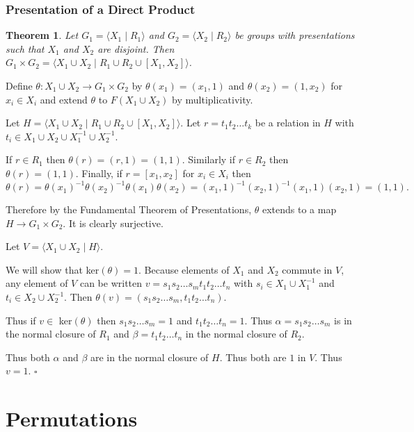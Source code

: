 \documentclass[10pt]{article}
\newtheorem{theorem}{Theorem}[section]
\newenvironment{proof}[1][Proof]{\begin{trivlist}
\item[\hskip \labelsep {\itshape #1}]}{\end{trivlist}}
\begin{document}
\subsubsection{Presentation of a Direct Product}

\begin{theorem}
Let $G_1 = \langle X_1 \;|\; R_1 \rangle$ and $G_2 = \langle X_2 \;|\; R_2 \rangle$ be groups with presentations such that $X_1$ and $X_2$ are disjoint. Then $G_1\times G_2 = \langle X_1\cup X_2 \;|\; R_1\cup R_2\cup [X_1, X_2] \rangle$.
\end{theorem}

\begin{proof}
Define $\theta : X_1\cup X_2 \to G_1\times G_2$ by $\theta(x_1) = (x_1, 1)$ and $\theta(x_2) = (1, x_2)$ for $x_i \in X_i$ and extend $\theta$ to $F(X_1\cup X_2)$ by multiplicativity.

Let $H = \langle X_1\cup X_2 \;|\; R_1\cup R_2\cup [X_1, X_2] \rangle$. Let $r = t_1t_2\ldots t_k$ be a relation in $H$ with $t_i \in X_1\cup X_2\cup X_1^{-1}\cup X_2^{-1}$.

If $r \in R_1$ then $\theta(r) = (r, 1) = (1, 1)$. Similarly if $r \in R_2$ then $\theta(r) = (1, 1)$. Finally, if $r = [x_1, x_2]$ for $x_i \in X_i$ then
$$\theta(r) = \theta(x_1)^{-1}\theta(x_2)^{-1}\theta(x_1)\theta(x_2) = (x_1, 1)^{-1}(x_2, 1)^{-1}(x_1, 1)(x_2, 1) = (1, 1).$$

Therefore by the Fundamental Theorem of Presentations, $\theta$ extends to a map $H \to G_1\times G_2$. It is clearly surjective.

Let $V = \langle X_1\cup X_2 \;|\; H \rangle$.

We will show that ker$(\theta) = 1$. Because elements of $X_1$ and $X_2$ commute in $V$, any element of $V$ can be written $v = s_1s_2\ldots s_mt_1t_2\ldots t_n$ with $s_i \in X_1\cup X_1^{-1}$ and $t_i \in X_2\cup X_2^{-1}$. Then $\theta(v) = (s_1s_2\ldots s_m, t_1t_2\ldots t_n)$.

Thus if $v \in$ ker$(\theta)$ then $s_1s_2\ldots s_m = 1$ and $t_1t_2\ldots t_n = 1$. Thus $\alpha = s_1s_2\ldots s_m$ is in the normal closure of $R_1$ and $\beta = t_1t_2\ldots t_n$ in the normal closure of $R_2$.

Thus both $\alpha$ and $\beta$ are in the normal closure of $H$. Thus both are $1$ in $V$. Thus $v = 1$. $\square$
\end{proof}

\section{Permutations}
\end{document}
